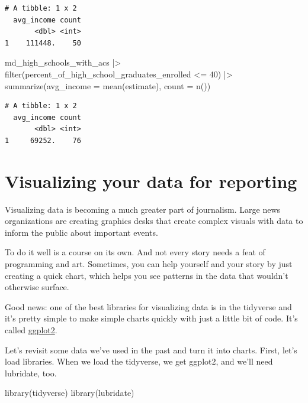 \documentclass[
  letterpaper,
  DIV=11,
  numbers=noendperiod]{scrreprt}
\newenvironment{Shaded}{\begin{snugshade}}{\end{snugshade}}
\newcommand{\AttributeTok}[1]{\textcolor[rgb]{0.40,0.45,0.13}{#1}}
\newcommand{\DecValTok}[1]{\textcolor[rgb]{0.68,0.00,0.00}{#1}}
\newcommand{\FunctionTok}[1]{\textcolor[rgb]{0.28,0.35,0.67}{#1}}
\newcommand{\NormalTok}[1]{\textcolor[rgb]{0.00,0.23,0.31}{#1}}
\newcommand{\SpecialCharTok}[1]{\textcolor[rgb]{0.37,0.37,0.37}{#1}}
\begin{document}
\begin{verbatim}
# A tibble: 1 x 2
  avg_income count
       <dbl> <int>
1    111448.    50
\end{verbatim}

\begin{Shaded}
\begin{Highlighting}[]
\NormalTok{md\_high\_schools\_with\_acs }\SpecialCharTok{|\textgreater{}}
  \FunctionTok{filter}\NormalTok{(percent\_of\_high\_school\_graduates\_enrolled }\SpecialCharTok{\textless{}=} \DecValTok{40}\NormalTok{) }\SpecialCharTok{|\textgreater{}} 
  \FunctionTok{summarize}\NormalTok{(}\AttributeTok{avg\_income =} \FunctionTok{mean}\NormalTok{(estimate), }\AttributeTok{count =} \FunctionTok{n}\NormalTok{())}
\end{Highlighting}
\end{Shaded}

\begin{verbatim}
# A tibble: 1 x 2
  avg_income count
       <dbl> <int>
1     69252.    76
\end{verbatim}


\hypertarget{visualizing-your-data-for-reporting}{%
\chapter{Visualizing your data for
reporting}\label{visualizing-your-data-for-reporting}}

Visualizing data is becoming a much greater part of journalism. Large
news organizations are creating graphics desks that create complex
visuals with data to inform the public about important events.

To do it well is a course on its own. And not every story needs a feat
of programming and art. Sometimes, you can help yourself and your story
by just creating a quick chart, which helps you see patterns in the data
that wouldn't otherwise surface.

Good news: one of the best libraries for visualizing data is in the
tidyverse and it's pretty simple to make simple charts quickly with just
a little bit of code. It's called
\href{https://ggplot2.tidyverse.org/}{ggplot2}.

Let's revisit some data we've used in the past and turn it into charts.
First, let's load libraries. When we load the tidyverse, we get ggplot2,
and we'll need lubridate, too.

\begin{Shaded}
\begin{Highlighting}[]
\FunctionTok{library}\NormalTok{(tidyverse)}
\FunctionTok{library}\NormalTok{(lubridate)}
\end{Highlighting}
\end{Shaded}
\end{document}
